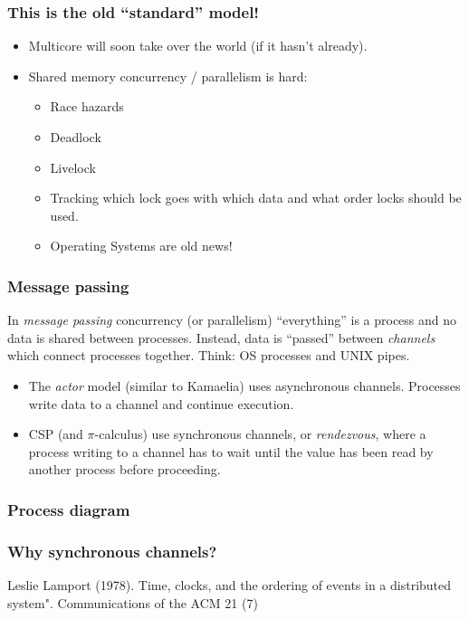 \documentclass{beamer}
\begin{document}
\frame
{
  \frametitle{This is the old ``standard'' model!}

  \begin{itemize}
  \item Multicore will soon take over the world (if it hasn't already).
  \item Shared memory concurrency / parallelism is hard:
    \begin{itemize}
    \item Race hazards
    \item Deadlock
    \item Livelock
    \item Tracking which lock goes with which data and what order
      locks should be used.
    \item Operating Systems are old news!
    \end{itemize}
  \end{itemize}
}

\frame
{
  \frametitle{Message passing}

  \begin{definition}
    In \emph{message passing} concurrency (or parallelism)
    ``everything'' is a process and no data is shared between
    processes. Instead, data is ``passed'' between \emph{channels}
    which connect processes together. Think: OS processes and UNIX
    pipes.
  \end{definition}

  \begin{itemize}
  \item The \emph{actor} model (similar to Kamaelia) uses asynchronous
    channels. Processes write data to a channel and continue execution. 
  \item CSP (and $\pi$-calculus) use synchronous channels, or
    \emph{rendezvous}, where a process writing to a channel has to
    wait until the value has been read by another process before
    proceeding.
  \end{itemize}
}

\frame
{
  \frametitle{Process diagram}
}


\frame
{
  \frametitle{Why synchronous channels?}
  \begin{block}{}
    Leslie Lamport (1978). Time, clocks, and the ordering of events in a
    distributed system". Communications of the ACM 21 (7)
  \end{block}
}

\end{document}

